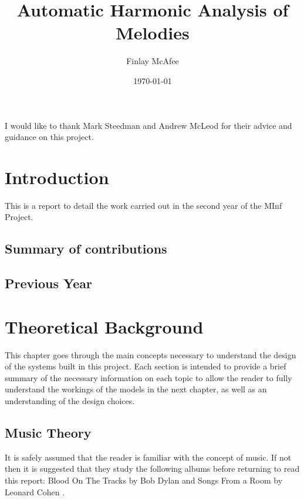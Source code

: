 \documentclass[bsc,singlespacing,logo, parskip, deptreport]{infthesis}
\begin{document}
\title{Automatic Harmonic Analysis of Melodies}

\author{Finlay McAfee}


\date{\today}

\abstract{
}

\maketitle
\begin{acknowledgements}
I would like to thank Mark Steedman and Andrew McLeod for their advice and guidance on this project.
\end{acknowledgements}
\standarddeclaration
\tableofcontents


\chapter{Introduction}
This is a report to detail the work carried out in the second year of the MInf Project.
\section{Summary of contributions}

\section{Previous Year}


\chapter{Theoretical Background}
This chapter goes through the main concepts necessary to understand the design of the systems built in this project. Each section is intended to provide a brief summary of the necessary information on each topic to allow the reader to fully understand the workings of the models in the next chapter, as well as an understanding of the design choices.

\section{Music Theory}
It is safely assumed that the reader is familiar with the concept of music. If not then it is suggested that they study the following albums before returning to read this report: Blood On The Tracks by Bob Dylan \cite{dylan1975blood} and Songs From a Room by Leonard Cohen \cite{cohen2007songs}.
\end{document}
